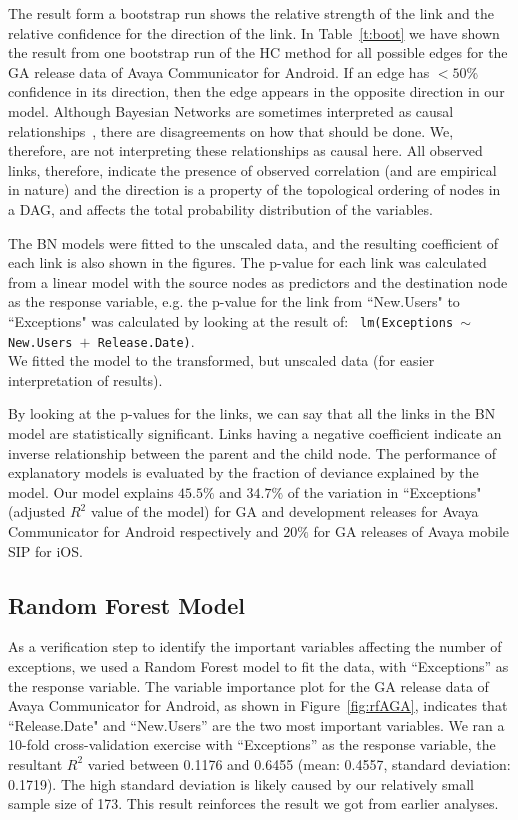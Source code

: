 \documentclass[smallextended]{svjour3}       %
\begin{document}
The result form a bootstrap run shows the relative strength of the
link and the relative confidence for the direction of the link. 
In Table~\ref{t:boot} we have shown the result from one bootstrap run of the HC method for all possible edges for the GA release data of Avaya Communicator for Android. If an edge has $<50\%$ confidence in its direction, then the edge appears in the opposite direction in our model.
Although Bayesian Networks are sometimes interpreted as causal relationships~\cite{pearl2011bayesian}, there are disagreements on how that should be done.
We, therefore, are not interpreting these relationships as causal here. All observed links, therefore, indicate the presence of observed correlation (and are empirical in nature) and the direction is a property of the topological ordering of nodes in a DAG, and affects the total probability distribution of the variables.

The BN models were fitted to
the unscaled data, and the resulting coefficient of each link is also shown
in the figures. The p-value for each link was calculated from a
linear model with the source nodes as predictors and the destination
node as the response variable, e.g. the p-value for the link from
``New.Users" to ``Exceptions" was calculated by looking at the
result of:  \texttt{  lm(Exceptions $\sim$ New.Users $+$ Release.Date)}. \\
We fitted the model to the transformed, but unscaled data (for easier interpretation of results). 

By looking at the p-values for the links, we can say that all the links in the BN model
are statistically significant. 
Links having a negative coefficient indicate an inverse relationship between the parent 
and the child node.
The performance of explanatory models is evaluated by the fraction
of deviance explained by the model. Our model explains $45.5\%$ and $34.7\%$ of the
variation in ``Exceptions" (adjusted $R^2$ value of the model) for GA and development releases for Avaya Communicator for Android respectively and $20\%$ for GA releases of Avaya mobile SIP for iOS. 


\subsection{Random Forest Model}
As a verification step to identify the important variables affecting the number of exceptions, we used a Random Forest model to fit the data, with ``Exceptions'' as the response variable. The variable importance plot for the GA release data of Avaya Communicator for Android, as shown in Figure~\ref{fig:rfAGA}, indicates that ``Release.Date" and ``New.Users'' are the two most important variables. We ran a 10-fold cross-validation exercise with ``Exceptions'' as the response variable, the resultant $R^2$ varied between 0.1176 and 0.6455 (mean: 0.4557, standard deviation: 0.1719). The high standard deviation is likely caused by our relatively small sample size of 173. This result reinforces the result we got from earlier analyses.
\end{document}

